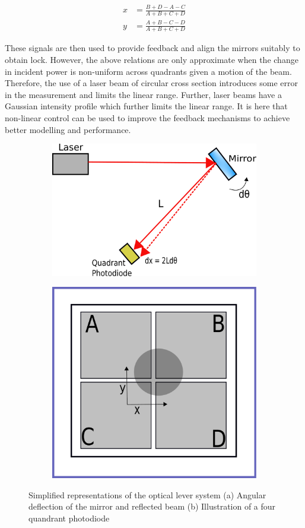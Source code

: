 \documentclass[colorlinks=true,pdfstartview=FitV,linkcolor=blue,
            citecolor=red,urlcolor=magenta]{ligodoc}
\begin{document}
    \begin{align}
    x & = \frac{B + D - A - C}{A + B + C + D} \label{x}\\
    y & = \frac{A + B - C - D}{A + B + C + D} \label{y}
    \end{align}

    These signals are then used to provide feedback and align the mirrors suitably to obtain lock. However, the above relations are only approximate when the change in incident power is non-uniform across quadrants given a motion of the beam. Therefore, the use of a laser beam of circular cross section introduces some error in the measurement and limits the linear range. Further, laser beams have a Gaussian intensity profile which further limits the linear range. It is here that non-linear control can be used to improve the feedback mechanisms to achieve better modelling and performance.


    \begin{figure}[htbp]
      \centering
        \begin{subfigure}[b]{0.4\textwidth}
          \centering
          \includegraphics[width=\linewidth]{2theta.pdf}
          \caption{}
          \label{fig:2theta}
        \end{subfigure}%
        \begin{subfigure}[b]{0.4\textwidth}
          \centering
          \includegraphics[width=0.5\linewidth]{qpd.pdf}
          \caption{}
          \label{fig:qpd}
        \end{subfigure}
      \caption{Simplified representations of the optical lever system (a) Angular deflection of the mirror and reflected beam \cite{control_slides} (b) Illustration of a four quandrant photodiode}
      \label{fig:oplev}
    \end{figure}     
\end{document}

